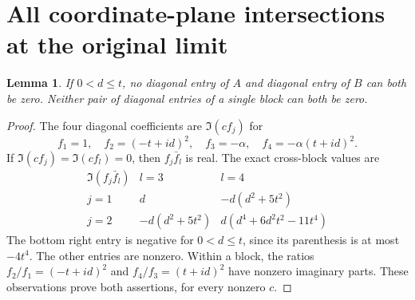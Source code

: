 \documentclass[11pt]{article}
\newtheorem{lemma}[theorem]{Lemma}
\begin{document}
\section{All coordinate-plane intersections at the original limit}
\begin{lemma}
If $0<d\le t$, no diagonal entry of $A$ and diagonal entry of $B$
can both be zero. Neither pair of diagonal entries of a single block
can both be zero.
\end{lemma}
\begin{proof}
The four diagonal coefficients are $\Im(cf_j)$ for
\[
 f_1=1,\quad f_2=(-t+id)^2,\quad
 f_3=-\alpha,\quad f_4=-\alpha(t+id)^2.
\]
If $\Im(cf_j)=\Im(cf_l)=0$, then $f_j\bar f_l$ is real. The exact
cross-block values are
\[
\begin{array}{c|cc}
 \Im(f_j\bar f_l)&l=3&l=4\\\hline
 j=1&d&-d(d^2+5t^2)\\
 j=2&-d(d^2+5t^2)&d(d^4+6d^2t^2-11t^4)
\end{array} \tag{NC16}
\]
The bottom right entry is negative for $0<d\le t$, since its
parenthesis is at most $-4t^4$. The other entries are nonzero.
Within a block, the ratios $f_2/f_1=(-t+id)^2$ and
$f_4/f_3=(t+id)^2$ have nonzero imaginary parts. These observations
prove both assertions, for every nonzero $c$.
\end{proof}
\end{document}
